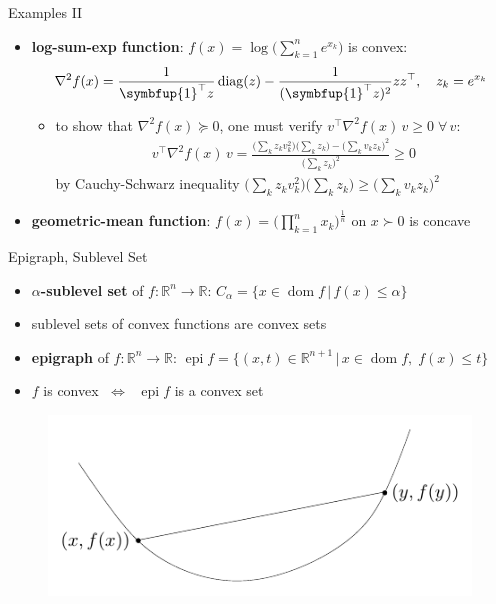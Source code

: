 \documentclass[10pt,handout]{beamer}
\newcommand{\ds}{\displaystyle}
\newcommand{\ifff}{\;\Longleftrightarrow\;}
\DeclareMathOperator*{\dom}{dom}
\DeclareMathOperator*{\diag}{diag}
\DeclareMathOperator*{\epi}{epi}
\theoremstyle{definition}
\begin{document}
\begin{frame}{Examples II}
  \begin{itemize}
    \item {\bf log-sum-exp function}: $\ds f(x) = \log\Big(\sum_{k = 1}^n e^{x_k}\Big)$ is convex:
      \begin{align*}
        \nabla^2 f(x) = \frac{1}{\symbfup{1}^\top z}\diag(z) - \frac{1}{(\symbfup{1}^\top z)^2}zz^\top, \quad z_k = e^{x_k}
      \end{align*}
      \begin{itemize}
        \item to show that $\nabla^2 f(x)\succcurlyeq 0$, one must verify $\ds v^\top\nabla^2 f(x)\,v\geqslant 0\;\forall\,v$:
          \begin{align*}  
            v^\top\nabla^2 f(x)\,v = \frac{\big(\sum_k z_k v_k^2\big)\big(\sum_k z_k\big) - \big(\sum_k v_k z_k\big)^2}{\big(\sum_k z_k\big)^2}\geqslant 0
          \end{align*}
          by Cauchy-Schwarz inequality $\ds \Big(\sum_k z_k v_k^2\Big)\Big(\sum_k z_k\Big) \geqslant \Big(\sum_k v_k z_k\Big)^2$
      \end{itemize}
    \item {\bf geometric-mean function}: $\ds f(x) = \Big(\prod_{k = 1}^n x_k\Big)^{\frac{1}{n}}$ on $x\succ 0$ is concave
  \end{itemize}
\end{frame}

\begin{frame}{Epigraph, Sublevel Set}
  \begin{itemize}
    \item {\bf $\alpha$-sublevel set} of $f:\mathbb{R}^n\to\mathbb{R}$: $\ds C_\alpha = \{x\in\dom f\,|\, f(x)\leqslant\alpha\}$
    \item sublevel sets of convex functions are convex sets
    \item {\bf epigraph} of $f: \mathbb{R}^n\to\mathbb{R}$: $\ds\epi f = \{(x, t)\in\mathbb{R}^{n+1}\,|\,x\in\dom f,\; f(x)\leqslant t\}$
    \item $f$ is convex $\ifff$ $\ds\epi f$ is a convex set
  \end{itemize}
  \begin{figure}[!htbp]
    \centering
    \includegraphics[scale=0.8,page=5]{fig/note06/03.pdf}
  \end{figure}
\end{frame}
\end{document}
